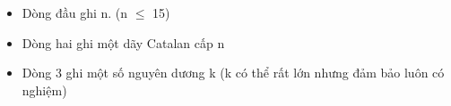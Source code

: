 \begin{itemize}
	\item Dòng đầu ghi n. (n  $\le$  15)
	\item Dòng hai ghi một dãy Catalan cấp n
	\item Dòng 3 ghi một số nguyên dương k (k có thể rất lớn nhưng đảm bảo luôn có nghiệm)
\end{itemize}

 